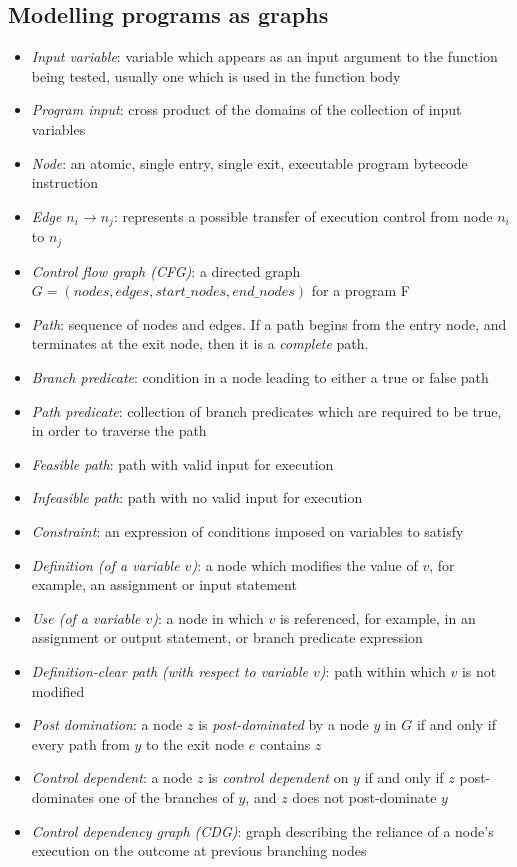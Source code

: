 \documentclass{icldt}
\numberwithin{equation}{section}       %
\begin{document}
\subsection{Modelling programs as graphs}
\begin{itemize}
	\item \emph{Input variable}: variable which appears as an input argument to the function being tested, usually one which is used in the function body
	\item \emph{Program input}: cross product of the domains of the collection of input variables
	\item \emph{Node}: an atomic, single entry, single exit, executable program bytecode instruction
	\item \emph{Edge $n_i \rightarrow n_j$}: represents a possible transfer of execution control from node $n_i$ to $n_j$
	\item \emph{Control flow graph (CFG)}: a directed graph $G = (nodes,edges,start\_nodes,end\_nodes)$ for a program F
	\item \emph{Path}: sequence of nodes and edges. If a path begins from the entry node, and terminates at the exit node, then it is a \emph{complete} path.
	\item \emph{Branch predicate}: condition in a node leading to either a true or false path
	\item \emph{Path predicate}: collection of branch predicates which are required to be true, in order to traverse the path
	\item \emph{Feasible path}: path with valid input for execution
	\item \emph{Infeasible path}: path with no valid input for execution
	\item \emph{Constraint}: an expression of conditions imposed on variables to satisfy
	\item \emph{Definition (of a variable $v$)}: a node which modifies the value of $v$, for example, an assignment or input statement
	\item \emph{Use (of a variable $v$)}: a node in which $v$ is referenced, for example, in an assignment or output statement, or branch predicate expression
	\item \emph{Definition-clear path (with respect to variable $v$)}: path within which $v$ is not modified
	\item \emph{Post domination}: a node $z$ is \emph{post-dominated} by a node $y$ in $G$ if and only if every path from $y$ to the exit node $e$ contains $z$
	\item \emph{Control dependent}: a node $z$ is \emph{control dependent} on $y$ if and only if $z$ post-dominates one of the branches of $y$, and $z$ does not post-dominate $y$
	\item \emph{Control dependency graph (CDG)}: graph describing the reliance of a node's execution on the outcome at previous branching nodes
\end{itemize}
\end{document}

